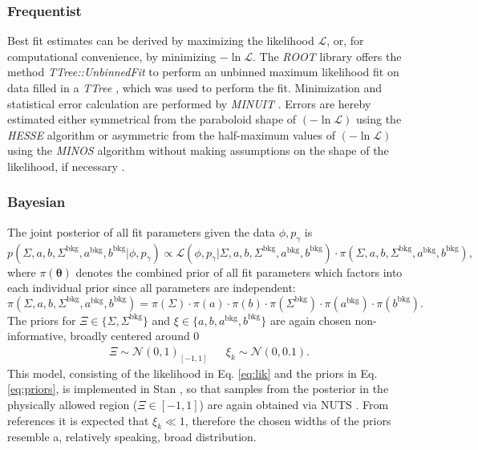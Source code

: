 \subsubsection{Frequentist}
Best fit estimates can be derived by maximizing the likelihood $\mathcal{L}$, or, for computational convenience, by minimizing $-\ln\mathcal{L}$. The \emph{ROOT} library \cite{root} offers the method \emph{TTree::UnbinnedFit} to perform an unbinned maximum likelihood fit on data filled in a \emph{TTree} \cite{runbinnedFit}, which was used to perform the fit. Minimization and statistical error calculation are performed by \emph{MINUIT} \cite{minuit}. Errors are hereby estimated either symmetrical from the paraboloid shape of $(-\ln\mathcal{L})$ using the \emph{HESSE} algorithm or asymmetric from the half-maximum values of $(-\ln\mathcal{L})$ using the \emph{MINOS} algorithm without making assumptions on the shape of the likelihood, if necessary \cite{minuit}.  
\subsubsection{Bayesian}
The joint posterior of all fit parameters given the data $\phi,p_\gamma$ is 
\begin{equation}
	p\left(\Sigma,a,b,\Sigma^\text{bkg},a^\text{bkg},b^\text{bkg}\big|\phi,p_\gamma\right)\propto \mathcal{L}\left(\phi,p_\gamma\big|\Sigma,a,b,\Sigma^\text{bkg},a^\text{bkg},b^\text{bkg}\right)\cdot\pi\left(\Sigma,a,b,\Sigma^\text{bkg},a^\text{bkg},b^\text{bkg}\right),
\end{equation}
where $\pi(\boldsymbol{\theta})$ denotes the combined prior of all fit parameters which factors into each individual prior since all parameters are independent:
\begin{equation}
	\pi\left(\Sigma,a,b,\Sigma^\text{bkg},a^\text{bkg},b^\text{bkg}\right)=\pi\left(\Sigma\right)\cdot\pi\left(a\right)\cdot\pi\left(b\right)\cdot\pi\left(\Sigma^\text{bkg}\right)\cdot\pi\left(a^\text{bkg}\right)\cdot\pi\left(b^\text{bkg}\right).
\end{equation}
The priors for $\Xi\in\{\Sigma,\Sigma^\text{bkg}\}$ and $\xi\in\{a,b,a^\text{bkg},b^\text{bkg}\}$ are again chosen non-informative, broadly centered around 0
\begin{align}
	\Xi\sim\mathcal{N}(0,1)_{[-1,1]} &&\xi_k\sim\mathcal{N}(0,0.1).
	\label{eq:priors}
\end{align}
This model, consisting of the likelihood in Eq. \eqref{eq:lik} and the priors in Eq. \eqref{eq:priors}, is implemented in Stan \cite{stan}, so that samples from the posterior in the physically allowed region ($\Xi\in[-1,1]$) are again obtained via NUTS \cite{nuts}. From references \cite{farahphd,hartmannphd} it  is expected that $\xi_k\ll1$, therefore the chosen widths of the priors resemble a, relatively speaking, broad distribution.
